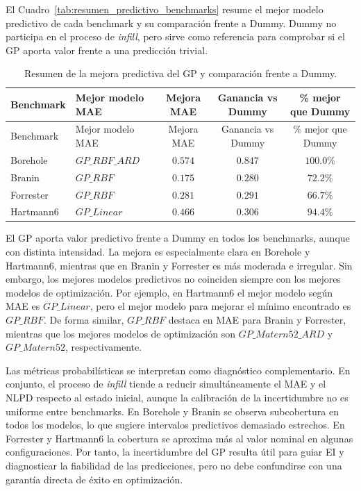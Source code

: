 El Cuadro~\ref{tab:resumen_predictivo_benchmarks} resume el mejor modelo predictivo de cada benchmark y su comparación frente a Dummy. Dummy no participa en el proceso de \emph{infill}, pero sirve como referencia para comprobar si el GP aporta valor frente a una predicción trivial.

\protect{}\label{tab:resumen_predictivo_benchmarks}
\begin{longtable}[]{@{}llccc@{}}
\caption{Resumen de la mejora predictiva del GP y comparación frente a Dummy.}\tabularnewline
\toprule\noalign{}
Benchmark & Mejor modelo MAE & Mejora MAE & Ganancia vs Dummy & \% mejor que Dummy \\
\midrule\noalign{}
\endfirsthead
\toprule\noalign{}
Benchmark & Mejor modelo MAE & Mejora MAE & Ganancia vs Dummy & \% mejor que Dummy \\
\midrule\noalign{}
\endhead
\bottomrule\noalign{}
\endlastfoot
Borehole & \(GP\_RBF\_ARD\) & \(0.574\) & \(0.847\) & \(100.0\%\) \\
Branin & \(GP\_RBF\) & \(0.175\) & \(0.280\) & \(72.2\%\) \\
Forrester & \(GP\_RBF\) & \(0.281\) & \(0.291\) & \(66.7\%\) \\
Hartmann6 & \(GP\_Linear\) & \(0.466\) & \(0.306\) & \(94.4\%\) \\
\end{longtable}

El GP aporta valor predictivo frente a Dummy en todos los benchmarks, aunque con distinta intensidad. La mejora es especialmente clara en Borehole y Hartmann6, mientras que en Branin y Forrester es más moderada e irregular. Sin embargo, los mejores modelos predictivos no coinciden siempre con los mejores modelos de optimización. Por ejemplo, en Hartmann6 el mejor modelo según MAE es \(GP\_Linear\), pero el mejor modelo para mejorar el mínimo encontrado es \(GP\_RBF\). De forma similar, \(GP\_RBF\) destaca en MAE para Branin y Forrester, mientras que los mejores modelos de optimización son \(GP\_Matern52\_ARD\) y \(GP\_Matern52\), respectivamente.

Las métricas probabilísticas se interpretan como diagnóstico complementario. En conjunto, el proceso de \emph{infill} tiende a reducir simultáneamente el MAE y el NLPD respecto al estado inicial, aunque la calibración de la incertidumbre no es uniforme entre benchmarks. En Borehole y Branin se observa subcobertura en todos los modelos, lo que sugiere intervalos predictivos demasiado estrechos. En Forrester y Hartmann6 la cobertura se aproxima más al valor nominal en algunas configuraciones. Por tanto, la incertidumbre del GP resulta útil para guiar EI y diagnosticar la fiabilidad de las predicciones, pero no debe confundirse con una garantía directa de éxito en optimización.

